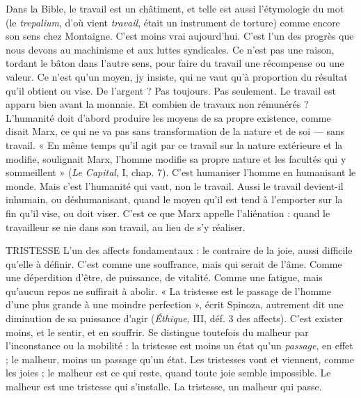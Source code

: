 Dans la Bible, le travail est un châtiment, et telle est aussi l’étymologie du
mot (le {\it trepalium}, d’où vient {\it travail}, était un instrument de torture) comme
encore son sens chez Montaigne. C’est moins vrai aujourd’hui. C’est l’un des
progrès que nous devons au machinisme et aux luttes syndicales. Ce n’est pas
une raison, tordant le bâton dans l’autre sens, pour faire du travail une récompense
ou une valeur. Ce n’est qu’un moyen, jy insiste, qui ne vaut qu’à proportion
du résultat qu’il obtient ou vise. De l’argent ? Pas toujours. Pas seulement.
Le travail est apparu bien avant la monnaie. Et combien de travaux non
rémunérés ? L’humanité doit d’abord produire les moyens de sa propre existence,
comme disait Marx, ce qui ne va pas sans transformation de la nature et
de soi — sans travail. « En même temps qu'il agit par ce travail sur la nature extérieure
et la modifie, soulignait Marx, l’homme modifie sa propre nature et les
facultés qui y sommeillent » ({\it Le Capital}, I, chap. 7). C’est humaniser l’homme en
humanisant le monde. Mais c’est l'humanité qui vaut, non le travail. Aussi le travail
devient-il inhumain, ou déshumanisant, quand le moyen qu’il est tend à
l'emporter sur la fin qu’il vise, ou doit viser. C’est ce que Marx appelle
l'aliénation : quand le travailleur se nie dans son travail, au lieu de s’y réaliser.

TRISTESSE L'un des affects fondamentaux : le contraire de la joie, aussi difficile
qu’elle à définir. C’est comme une souffrance, mais qui
serait de l’âme. Comme une déperdition d’être, de puissance, de vitalité. Comme
une fatigue, mais qu'aucun repos ne suffirait à abolir. « La tristesse est le passage
de l’homme d’une plus grande à une moindre perfection », écrit Spinoza, autrement
dit une diminution de sa puissance d’agir ({\it Éthique}, III, déf. 3 des affects).
C'est exister moins, et le sentir, et en souffrir. Se distingue toutefois du malheur
par l’inconstance ou la mobilité : la tristesse est moins un état qu’un {\it passage}, en
effet ; le malheur, moins un passage qu’un état. Les tristesses vont et viennent,
comme les joies ; le malheur est ce qui reste, quand toute joie semble impossible.
Le malheur est une tristesse qui s’installe. La tristesse, un malheur qui passe.

